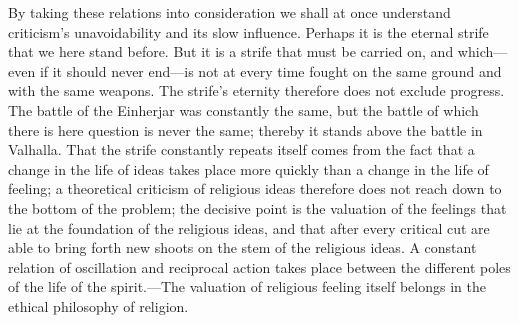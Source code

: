 \documentclass[12pt,a4paper]{book}
\newcommand{\opage}[1]{\marginnote{\footnotesize\textit{[#1]}}}
\begin{document}
By taking these relations into consideration we shall at once understand criticism's
unavoidability and its slow influence. Perhaps it is the eternal strife that we here stand
before. But it is a strife that must be carried on, and which---even if it should never
end---is not at every time fought on the same ground and with the same weapons. The strife's
eternity therefore does not exclude progress. The battle of the Einherjar was constantly the
same, but the battle of which there is here question is never the same; 
\opage{108}thereby it stands above
the battle in Valhalla. That the strife constantly repeats itself comes from the fact that a
change in the life of ideas takes place more quickly than a change in the life of feeling; a
theoretical criticism of religious ideas therefore does not reach down to the bottom of the
problem; the decisive point is the valuation of the feelings that lie at the foundation of the
religious ideas, and that after every critical cut are able to bring forth new shoots on the
stem of the religious ideas. A constant relation of oscillation and reciprocal action takes
place between the different poles of the life of the spirit.---The valuation of religious
feeling itself belongs in the ethical philosophy of religion.

\medskip
\end{document}
